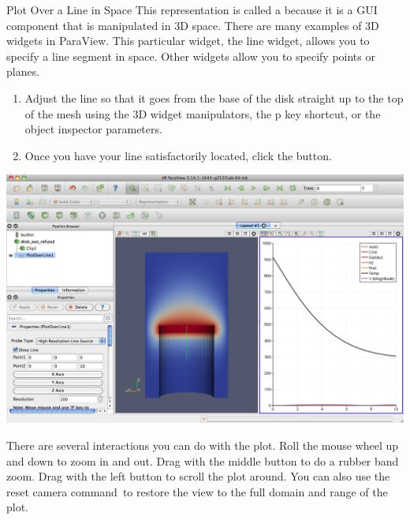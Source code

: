 \begin{exercise}{Plot Over a Line in Space}
  This representation is called a  because it is a GUI
  component that is manipulated in 3D space.  There are many examples of 3D
  widgets in ParaView.  This particular widget, the line widget, allows you
  to specify a line segment in space.  Other widgets allow you to specify
  points or planes.

  \begin{enumerate}
    \restorecounter
  \item Adjust the line so that it goes from the base of the disk straight up
    to the top of the mesh using the 3D widget manipulators, the p key
    shortcut, or the object inspector parameters.
  \item Once you have your line satisfactorily located, click the \apply
    button.
  \end{enumerate}

  \begin{inlinefig}
    \includegraphics[width=\scw]{images/LinePlot2}
  \end{inlinefig}

  There are several interactions you can do with the plot.  Roll the mouse 
  wheel up and down to zoom in and out.  Drag with the middle button
  to do a rubber band zoom.  Drag with the left button to scroll the plot
  around.  You can also use the reset camera command~\resetCamera to restore
  the view to the full domain and range of the plot.
\end{exercise}


